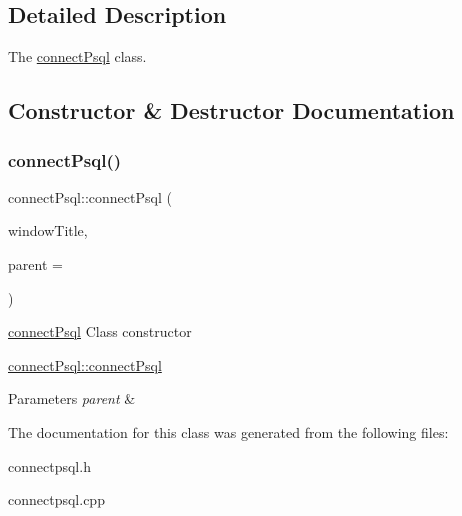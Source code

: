 \subsection{Detailed Description}
The \hyperlink{classconnect_psql}{connect\+Psql} class. 

\subsection{Constructor \& Destructor Documentation}
\mbox{\label{classconnect_psql_aee2b55cd64f5b2fac084eda4e6db0075}} 
\subsubsection{\texorpdfstring{connect\+Psql()}{connectPsql()}}
{\footnotesize\ttfamily connect\+Psql\+::connect\+Psql (\begin{DoxyParamCaption}\item[{Q\+String}]{window\+Title,  }\item[{Q\+Widget $\ast$}]{parent = {} }\end{DoxyParamCaption})\hspace{0.3cm}{\ttfamily [explicit]}}



\hyperlink{classconnect_psql}{connect\+Psql} Class constructor 

\hyperlink{classconnect_psql_aee2b55cd64f5b2fac084eda4e6db0075}{connect\+Psql\+::connect\+Psql}


\begin{DoxyParams}{Parameters}
{\em parent} & \\
\hline
\end{DoxyParams}


The documentation for this class was generated from the following files\+:\begin{DoxyCompactItemize}
\item 
connectpsql.\+h\item 
connectpsql.\+cpp\end{DoxyCompactItemize}
